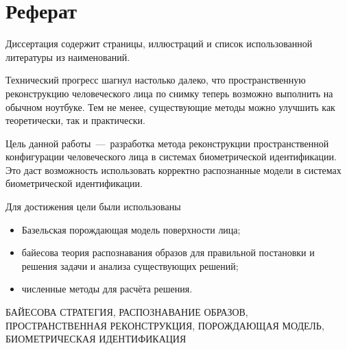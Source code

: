 \chapter*{Реферат}

Диссертация содержит \pageref{LastPage} страницы,
 иллюстраций
и список использованной литературы из
 наименований.

Технический прогресс шагнул настолько далеко,
что пространственную реконструкцию человеческого лица по снимку
теперь возможно выполнить на обычном ноутбуке.
Тем не менее,
существующие методы можно улучшить как теоретически, так и практически.

Цель данной работы~---~разработка метода
реконструкции пространственной конфигурации человеческого лица
в системах биометрической идентификации.
Это даст возможность использовать корректно распознанные модели
в системах биометрической идентификации.

Для достижения цели были использованы
\begin{itemize}
  \item
    Базельская порождающая модель поверхности лица;
  \item
    байесова теория распознавания образов
    для правильной постановки и решения задачи и анализа существующих решений;
  \item
    численные методы для расчёта решения.
\end{itemize}

\MakeUppercase{байесова стратегия, распознавание образов,
пространственная реконструкция, порождающая модель,
биометрическая идентификация}

